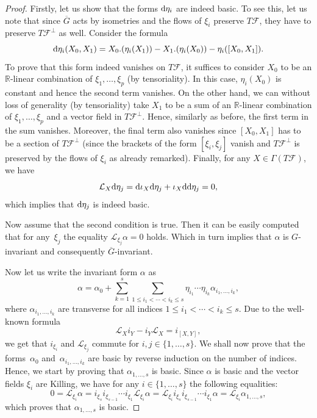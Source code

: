 \documentclass[pdftex]{sigma}
\numberwithin{equation}{section}
\theoremstyle{definition}
\begin{document}
\begin{proof}
Firstly, let us show that the forms ${\rm d}\eta_i$ are indeed basic. To see this, let us note that since $\overline{G}$ acts by isometries and the flows of $\xi_i$ preserve $T\mathcal{F}$, they have to preserve $T\mathcal{F}^{\perp}$ as well. Consider the formula
\[{\rm d}\eta_i(X_0,X_1)= X_0.(\eta_i(X_1))-X_1.(\eta_i(X_0)) -\eta_i([X_0,X_1]).\]
To prove that this form indeed vanishes on $T\mathcal{F}$, it suffices to consider $X_0$ to be an $\mathbb{R}$-linear combination of $\xi_1,\dots,\xi_p$ (by tensoriality). In this case, $\eta_i(X_0)$ is constant and hence the second term vanishes. On the other hand, we can without loss of generality (by tensoriality) take $X_1$ to be a sum of an $\mathbb{R}$-linear combination of $\xi_1,\dots,\xi_p$ and a vector field in $T\mathcal{F}^{\perp}$. Hence, similarly as before, the first term in the sum vanishes. Moreover, the final term also vanishes since $[X_0,X_1]$ has to be a section of $T\mathcal{F}^{\perp}$ (since the brackets of the form $[\xi_i,\xi_j]$ vanish and $T\mathcal{F}^{\perp}$ is preserved by the flows of $\xi_i$ as already remarked). Finally, for any $X\in\Gamma(T\mathcal{F})$, we have{\samepage
\[\mathcal{L}_X{\rm d}\eta_j={\rm d}\iota_X{\rm d}\eta_j+\iota_X{\rm d}{\rm d}\eta_j=0,\]
which implies that ${\rm d}\eta_j$ is indeed basic.}

Now assume that the second condition is true. Then it can be easily computed that for any~$\xi_j$ the equality $\mathcal{L}_{\xi_j}\alpha=0$ holds. Which in turn implies that $\alpha$ is $G$-invariant and consequently $\overline{G}$-invariant.

Now let us write the invariant form $\alpha$ as
\[\alpha=\alpha_0+\sum\limits_{k=1}^s\sum\limits_{1\leq i_1<\cdots <i_k\leq s}\eta_{i_1}\cdots \eta_{i_k}\alpha_{i_1,\dots,i_k},\]
where $\alpha_{i_1,\dots,i_k}$ are transverse for all indices $1\leq i_1<\cdots <i_k\leq s$. Due to the well-known formula
\[\mathcal{L}_{X}i_{Y}-i_{Y}\mathcal{L}_{X}=i_{[X,Y]},\]
we get that $i_{\xi_i}$ and $\mathcal{L}_{\xi_j}$ commute for $i,j\in\{1,\dots,s\}$. We shall now prove that the forms~$\alpha_0$ and~${\alpha_{i_1,\dots,i_k}}$ are basic by reverse induction on the number of indices. Hence, we start by proving that $\alpha_{1,\dots,s}$ is basic. Since $\alpha$ is basic and the vector fields $\xi_i$ are Killing, we have for any ${i\in\{1,\dots,s\}}$ the following equalities:
\[0=\mathcal{L}_{\xi_i}\alpha=i_{\xi_s}i_{\xi_{s-1}}\cdots i_{\xi_1}\mathcal{L}_{\xi_i}\alpha=\mathcal{L}_{\xi_i}i_{\xi_{s}}i_{\xi_{s-1}}\cdots i_{\xi_1}\alpha=\mathcal{L}_{\xi_i}\alpha_{1,\dots,s},\]
which proves that $\alpha_{1,\dots,s}$ is basic.


\end{proof}
\end{document}
